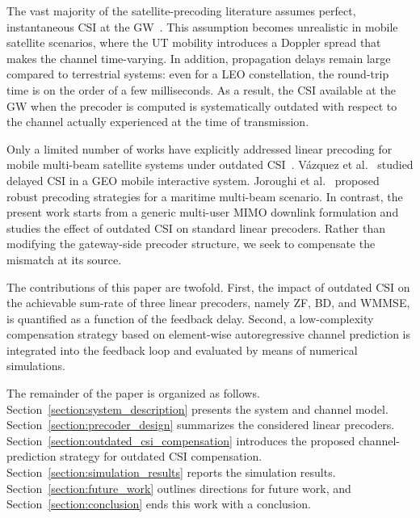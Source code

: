 \documentclass[conference]{IEEEtran}
\begin{document}
The vast majority of the satellite-precoding literature assumes perfect, instantaneous \ac{CSI} at the \ac{GW}~\cite{precoding_for_satellites_survey}.
This assumption becomes unrealistic in mobile satellite scenarios, where the \ac{UT} mobility introduces a Doppler spread that makes the channel time-varying. In addition, propagation delays remain large compared to terrestrial systems: even for a \acs{LEO} constellation, the round-trip time is on the order of a few milliseconds.
As a result, the \ac{CSI} available at the \ac{GW} when the precoder is computed is systematically outdated with respect to the channel actually experienced at the time of transmission.

Only a limited number of works have explicitly addressed linear precoding for mobile multi-beam satellite systems under outdated \ac{CSI}~\cite{precoding_for_satellites_survey}.
Vázquez et al.~\cite{delayed_csi_precoding_for_satellites_spain} studied delayed \ac{CSI} in a \acs{GEO} mobile interactive system.
Joroughi et al.~\cite{delayed_csi_precoding_for_satellite_luxembourg} proposed robust precoding strategies for a maritime multi-beam scenario.
In contrast, the present work starts from a generic multi-user \ac{MIMO} downlink formulation and studies the effect of outdated \ac{CSI} on standard linear precoders.
Rather than modifying the gateway-side precoder structure, we seek to compensate the mismatch at its source.

The contributions of this paper are twofold.
First, the impact of outdated \ac{CSI} on the achievable sum-rate of three linear precoders, namely \ac{ZF}, \ac{BD}, and \ac{WMMSE}, is quantified as a function of the feedback delay.
Second, a low-complexity compensation strategy based on element-wise autoregressive channel prediction is integrated into the feedback loop and evaluated by means of numerical simulations.

The remainder of the paper is organized as follows.
Section~\ref{section:system_description} presents the system and channel model.
Section~\ref{section:precoder_design} summarizes the considered linear precoders.
Section~\ref{section:outdated_csi_compensation} introduces the proposed channel-prediction strategy for outdated \ac{CSI} compensation.
Section~\ref{section:simulation_results} reports the simulation results.
Section~\ref{section:future_work} outlines directions for future work, and Section~\ref{section:conclusion} ends this work with a conclusion.
\end{document}
